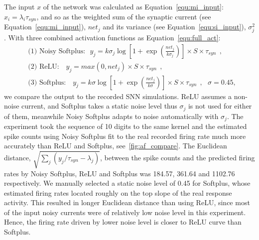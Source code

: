 \documentclass{article}
\begin{document}
The input $x$ of the network was calculated as Equation~\ref{equ:mi_input}: $x_i=\lambda_i\tau_{syn}$, and so as the weighted sum of the synaptic current (see Equation~\ref{equ:mi_input}), $net_j$ and its variance (see Equation~\ref{equ:si_input}), $\sigma^2_j$.
With three combined activation functions as Equation~\ref{equ:full_act}:
\begin{equation}
\begin{aligned}
&\textrm{(1) Noisy Softplus:~~}  y_j=k \sigma_j \log [1 + \exp(\frac{net_j}{k \sigma_j})] \times S \times \tau_{syn}~~,  \\
&\textrm{(2) ReLU:~~ } y_j=max(0, net_j) \times S \times \tau_{syn}~~, \\
&\textrm{(3) Softplus:~~ } y_j=k \sigma \log [1 + \exp(\frac{net_j}{k \sigma})] \times S \times \tau_{syn}~~, ~~~\sigma=0.45,  
\end{aligned}
\end{equation}	
we compare the output to the recorded SNN simulations.
ReLU assumes a non-noise current, and Softplus takes a static noise level thus $\sigma_j$ is not used for either of them, meanwhile Noisy Softplus adapts to noise automatically with $\sigma_j$.
The experiment took the sequence of 10 digits to the same kernel and the estimated spike counts using Noisy Softplus fit to the real recorded firing rate much more accurately than ReLU and Softplus,  see~\ref{fig:af_compare}.
The Euclidean distance, $\sqrt{\sum_{j}(y_j/\tau_{syn} - \lambda_j)}$, between the spike counts and the predicted firing rates by Noisy Softplus, ReLU and Softplus was 184.57, 361.64 and 1102.76 respectively.
We manually selected a static noise level of 0.45 for Softplus, whose estimated firing rates located roughly on the top slope of the real response activity.
This resulted in longer Euclidean distance than using ReLU, since most of the input noisy currents were of relatively low noise level in this experiment.
Hence, the firing rate driven by lower noise level is closer to ReLU curve than Softplus.
\end{document}
